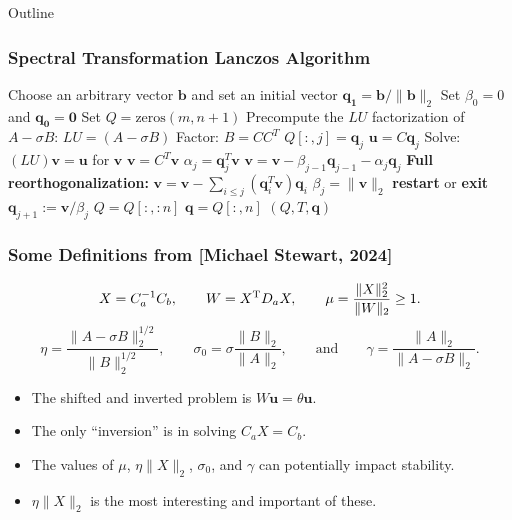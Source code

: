 \documentclass[landscape]{beamer}
\newcommand{\eqand}{\qquad\mbox{and}\qquad}
\renewcommand{\vec}[1]{\bm{#1}}
\newcommand{\T}{{\rm T}}
\newcommand{\comm}[1]{\added[comment={#1}]{}}
\begin{document}
\begin{frame}[allowframebreaks]{Outline}
	\frametitle{Spectral Transformation Lanczos Algorithm\comm{You could really use a slide before this of math describing the Lanczos algorithm and the Lanczos decomposition, along with the Lanczos decomposition error that you reference in a later slide.  I didn't know about the allowframebreaks option.  That's good to know.}}
	
	\begin{algorithmic}[1]
		\State Choose an arbitrary vector $\mathbf{b}$ and set an initial vector $\mathbf{q_1} = \mathbf{b}/ \|\mathbf{b}\|_2$
		\State Set $\beta_0 = 0$ and $\mathbf{q_0} = \mathbf{0}$
		\State Set $Q = \text{zeros}(m, n+1)$
		\State Precompute the $LU$ factorization of $A - \sigma B$: $LU = (A - \sigma B)$
		\State Factor: $B = CC^T$
		\State $Q[:, j] = \mathbf{q}_j$
		\State $\mathbf{u} = C\mathbf{q}_j$
		\State Solve: $(LU)\mathbf{v} = \mathbf{u}$ for $\mathbf{v}$
		\pause
		\State $\mathbf{v} = C^T \mathbf{v}$
		\State $\alpha_j = \mathbf{q}_j^T \mathbf{v} $
		\State $\mathbf{v} = \mathbf{v} - \beta_{j-1}\mathbf{q}_{j-1} - \alpha_j \mathbf{q}_j$
		\State \textbf{Full reorthogonalization:} $\mathbf{v} = \mathbf{v} - \sum_{i \leq j} (\mathbf{q}_i^T \mathbf{v}) \mathbf{q}_i$
		\State $\beta_{j} = \|\mathbf{v}\|_2$
		\State \textbf{restart} or \textbf{exit}
		\EndIf
		\State $\mathbf{q}_{j+1} := \mathbf{v} / \beta_{j}$
		\EndIf
		\EndFor
		\State $Q = Q[:, :n]$\comm{I would use $Q[:, 1:n]$.  The notation $:n$ is very specific to Python and not widely used in pseudocode.}
		\State $\mathbf{q} = Q[:, n]$
		\State \Return $(Q, T, \mathbf{q})$
		\EndFunction
	\end{algorithmic}
\end{frame}

\begin{frame}
  \frametitle{Some Definitions from [Michael Stewart, 2024]}

  \begin{equation*}
    X = C_a^{-1} C_b,  \qquad W = X^\T D_a X, \qquad
    \mu = \frac{\|X\|_2^2}{\|W\|_2} \geq 1.
  \end{equation*}
  \begin{equation*}
    \eta = \frac{\|A-\sigma B\|_2^{1/2}}{\|B\|_2^{1/2}},\qquad \sigma_0 = \sigma \frac{\|B\|_2}{\|A\|_2},
    \eqand \gamma = \frac{\|A\|_2}{\|A-\sigma B\|_2}.
  \end{equation*}
  
  \begin{itemize}
  \item The shifted and inverted problem is $W \vec{u} = \theta \vec{u}$.
  \item The only ``inversion'' is in solving $C_a X = C_b$.
  \item The values of $\mu$, $\eta \|X\|_2$, $\sigma_0$, and $\gamma$
    can potentially impact stability.
  \item $\eta \|X\|_2$ is the most interesting and important of these.
  \end{itemize}
\end{frame}
\end{document}
